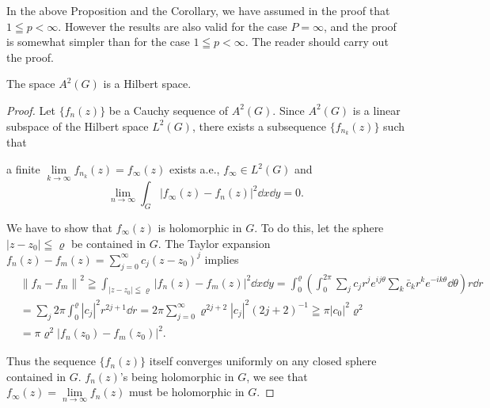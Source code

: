 \begin{remarku} In the above Proposition and the Corollary, we have assumed in the proof that $1 \leqq p< \infty$. However the results are also valid for the case $P= \infty$, and the proof is somewhat simpler than for the case $1 \leqq p< \infty$. The reader should carry out the proof. 
\end{remarku}

\begin{proposition}\label{prop:I.9.Proposition.3} The space $A^2(G)$ is a Hilbert space. 
\end{proposition}

\begin{proof}
 Let $\{f_n(z)\}$ be a Cauchy sequence of $A^2(G)$. Since $A^2(G)$ is a linear subspace of the Hilbert space $L^2(G)$, there exists a subsequence $\{f_{n_{k}}(z)\}$ such that 

a finite $\lim\limits_{k\to \infty}f_{n_{k}}(z) = f_\infty (z)$ exists a.e., $f_{\infty}\in L^{2}(G)$ and 
\[
\lim\limits_{n \rightarrow \infty} \int_{G} | f_{\infty} (z)- f_{n} (z) | ^{2} \dd x \dd y = 0. \]

We have to show that $f_{\infty}(z)$ is holomorphic in $G$. To do this, let the sphere $|z- z_0| \leqq \varrho$ be contained in $G$. The Taylor expansion $f_n(z)- f_m(z) = \sum\limits_{j=0}^{\infty} c_j (z- z_0)^j$ implies 
\begin{equation}\label{eq:I.9.4}
\begin{aligned}
&\left\| f_{n}- f_{m} \right\| ^{2} \geqq \int_ {\left| z- z_{0} \right| \leqq \varrho} \left| f_{n} (z)- f_{m} (z) \right| ^{2} \dd x \dd y = \int_{0} ^{\varrho} \left(\int_{0} ^{2 \pi} \sum\limits_{j} c_{j} r ^{j} e ^{i j \theta} \sum\limits_{k} \bar {c}_{k} r ^{k} e ^{- i k \theta} \dd \theta\right) r \dd r
\\
&= \sum\limits_{j} 2 \pi \int_{0} ^{\varrho} \left| c_{j} \right| ^{2} r ^{2j+1} \dd r = 2 \pi \sum\limits_{j=0} ^{\infty} \varrho^{2j+2} \left| c_{j} \right| ^{2} (2 j + 2) ^{-1} \geqq \pi \left| c_{0} \right| ^{2} \varrho^{2}
\\
&= \pi \varrho^{2} \left| f_{n} (z_{0})- f_{m} (z_{0}) \right| ^{2}.
\end{aligned}
\end{equation}

Thus the sequence $\{f_n(z)\}$ itself converges uniformly on any closed sphere contained in $G$. $f_n(z)$'s being holomorphic in $G$, we see that $f_\infty(z) = \lim\limits_{n \to \infty} f_n(z)$ must be holomorphic in $G$. 
\end{proof}

